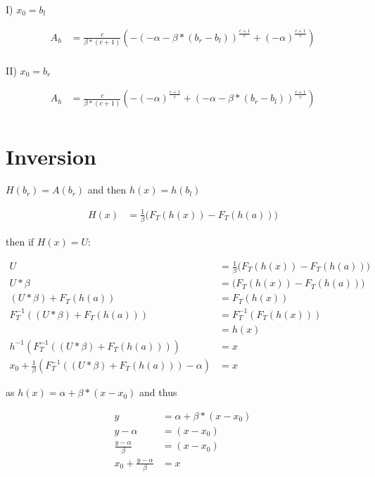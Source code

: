 \documentclass[]{article}
\begin{document}
I) $x_0 = b_l$

\begin{align*}
A_h &= \frac{c}{\beta * (c + 1)}  \left( - (- \alpha - \beta * (b_r - b_l))^{\frac{c + 1}{c}} + (-\alpha)^{\frac{c + 1}{c}} \right) \\
\end{align*}

II) $x_0 = b_r$

\begin{align*}
A_h &= \frac{c}{\beta * (c + 1)}  \left(- (-\alpha)^{\frac{c + 1}{c}} + (- \alpha - \beta * (b_r - b_l))^{\frac{c + 1}{c}}\right) \\
\end{align*}

\section{Inversion}

$H(b_r) = A(b_r)$ and then $h(x) = h(b_l)$

\begin{align*}
H(x) &= \frac{1}{\beta} \big( F_T (h(x)) - F_T(h(a)) \big)
\end{align*}

then if $H(x) = U$:

\begin{align*}
U &= \frac{1}{\beta} \big( F_T (h(x)) - F_T(h(a)) \big) \\
U * \beta &=\big( F_T (h(x)) - F_T(h(a)) \big) \\
(U * \beta) + F_T(h(a)) &= F_T (h(x)) \\
F_T^{-1} ( (U * \beta) + F_T(h(a))) &= F_T^{-1}( F_T (h(x))) \\
 &= h(x) \\
h^{-1} \left( F_T^{-1} ( (U * \beta) + F_T(h(a))) \right) &= x \\
x_0 + \frac{1}{\beta} \left( F_T^{-1} ( (U * \beta) + F_T(h(a))) - \alpha \right) &= x
\end{align*}

as $h(x) = \alpha + \beta * (x - x_0)$ and thus 

\begin{align*}
y &= \alpha + \beta * (x - x_0) \\
y - \alpha &= (x - x_0) \\
\frac{y - \alpha}{\beta} &=  (x - x_0) \\
x_0 + \frac{y - \alpha}{\beta} &=  x \\
\end{align*}
\end{document}

